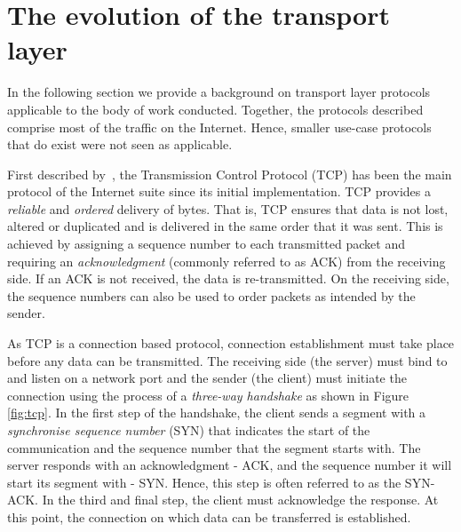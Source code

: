 \section{The evolution of the transport layer}

In the following section we provide a background on transport layer protocols applicable to the body of work conducted.
Together, the protocols described comprise most of the traffic on the Internet.
Hence, smaller use-case protocols that do exist were not seen as applicable.

First described by~\citet{cerf_protocol_1974}, the Transmission Control Protocol (TCP) has been the main protocol of the Internet suite since its initial implementation.
TCP provides a \textit{reliable} and \textit{ordered} delivery of bytes.
That is, TCP ensures that data is not lost, altered or duplicated and is delivered in the same order that it was sent.
This is achieved by assigning a sequence number to each transmitted packet and requiring an \textit{acknowledgment} (commonly referred to as ACK) from the receiving side.
If an ACK is not received, the data is re-transmitted.
On the receiving side, the sequence numbers can also be used to order packets as intended by the sender.

As TCP is a connection based protocol, connection establishment must take place before any data can be transmitted.
The receiving side (the server) must bind to and listen on a network port and the sender (the client) must initiate the connection using the process of a \textit{three-way handshake} as shown in Figure \ref{fig:tcp}.
In the first step of the handshake, the client sends a segment with a \textit{synchronise sequence number} (SYN) that indicates the start of the communication and the sequence number that the segment starts with.
The server responds with an acknowledgment - ACK, and the sequence number it will start its segment with - SYN.
Hence, this step is often referred to as the SYN-ACK.
In the third and final step, the client must acknowledge the response.
At this point, the connection on which data can be transferred is established.

